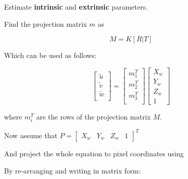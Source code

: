 \documentclass[10pt,a4paper]{scrartcl}
\begin{document}
\begin{multicols*}{2}
Estimate \textbf{intrinsic} and \textbf{extrinsic} parameters.

Find the projection matrix $m$ as

\begin{equation*}
M = K[R|T]
\end{equation*}

Which can be used as follows:

\begin{equation*}
\begin{bmatrix}
\tilde{u}\\
\tilde{v}\\
\tilde{w}\\
\end{bmatrix}=
\begin{bmatrix}
m_1^T\\
m_2^T\\
m_3^T\\
\end{bmatrix}
\begin{bmatrix}
X_w\\
Y_w\\
Z_w\\
1
\end{bmatrix}
\end{equation*}

where $m_i^T$ are the rows of the projection matrix $M$.

Now assume that $P=\begin{bmatrix}
X_w&Y_w&Z_w&1
\end{bmatrix}^T$

And project the whole equation to pixel coordinates using


\vspace{3ex}

By re-arranging and writing in matrix form:


\end{multicols*}
\end{document}
